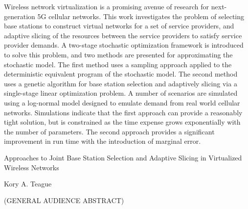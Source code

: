 \documentclass[12pt,dvipsnames]{report}
\begin{document}
Wireless network virtualization is a promising avenue of research for next-generation 5G cellular networks.  This work investigates the problem of selecting base stations to construct virtual networks for a set of service providers, and adaptive slicing of the resources between the service providers to satisfy service provider demands.  A two-stage stochastic optimization framework is introduced to solve this problem, and two methods are presented for approximating the stochastic model.  The first method uses a sampling approach applied to the deterministic equivalent program of the stochastic model.  The second method uses a genetic algorithm for base station selection and adaptively slicing via a single-stage linear optimization problem.  A number of scenarios are simulated using a log-normal model designed to emulate demand from real world cellular networks.  Simulations indicate that the first approach can provide a reasonably tight solution, but is constrained as the time expense grows exponentially with the number of parameters.  The second approach provides a significant improvement in run time with the introduction of marginal error.

\pagebreak

\thispagestyle{empty}
\begin{center}

{\large Approaches to Joint Base Station Selection and Adaptive Slicing in Virtualized Wireless Networks}

\vfill

Kory A. Teague

\vfill

(GENERAL AUDIENCE ABSTRACT)

\vfill

\end{center}
\end{document}
